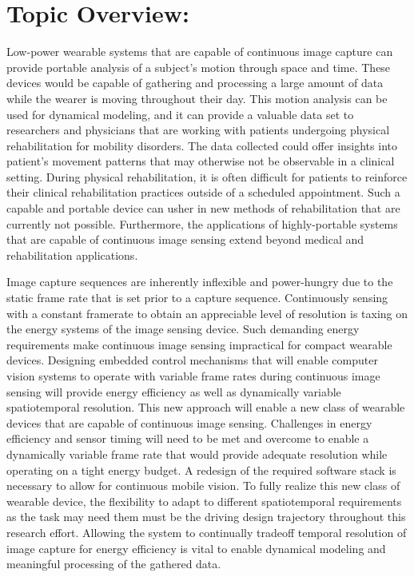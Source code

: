 \section{Topic Overview:}

\indent Low-power wearable systems that are capable of continuous image capture can provide portable analysis of a subject's motion through
space and time. These devices would be capable of gathering and processing a large amount of data while the wearer is moving throughout their
day. This motion analysis can be used for dynamical modeling, and it can provide a valuable data set to researchers and physicians that are working
with patients undergoing physical rehabilitation for mobility disorders. The data collected could offer insights into patient's movement
patterns that may otherwise not be observable in a clinical setting. During physical rehabilitation, it is often difficult for patients to
reinforce their clinical rehabilitation practices outside of a scheduled appointment. Such a capable and portable device can usher in
new methods of rehabilitation that are currently not possible. Furthermore, the applications of highly-portable systems that are capable of continuous
image sensing extend beyond medical and rehabilitation applications.

\indent Image capture sequences are inherently inflexible and power-hungry due to the static frame rate that is set prior to a capture
sequence. Continuously sensing with a constant framerate to obtain an appreciable level of resolution is taxing on the energy systems of the
image sensing device. Such demanding energy requirements make continuous image sensing impractical for compact wearable devices. Designing embedded
control mechanisms that will enable computer vision systems to operate with variable frame rates during continuous image sensing will provide energy
efficiency as well as dynamically variable spatiotemporal resolution. This new approach will enable a new class of wearable devices that are capable
of continuous image sensing. Challenges in energy efficiency and sensor timing will need to be met and overcome to enable a dynamically variable frame
rate that would provide adequate resolution while operating on a tight energy budget. A redesign of the required software stack is necessary to allow
for continuous mobile vision. To fully realize this new class of wearable device, the flexibility to adapt to different spatiotemporal requirements as
the task may need them must be the driving design trajectory throughout this research effort. Allowing the system to continually tradeoff temporal
resolution of image capture for energy efficiency is vital to enable dynamical modeling and meaningful processing of the gathered data.
